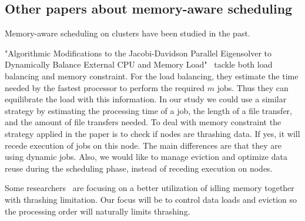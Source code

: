 \documentclass[a4paper]{article}
\begin{document}
\subsection{Other papers about memory-aware scheduling}
Memory-aware scheduling on clusters have been studied in the past.
 
"Algorithmic Modifications to the
Jacobi-Davidson Parallel Eigensolver to Dynamically Balance External CPU and Memory Load"~\cite{loadbalance_and_trashing} tackle both load balancing and memory constraint. For the load balancing, they 
estimate the time needed by the fastest processor to perform the required $m$ jobs. Thus they can equilibrate the load
with this information. In our study we could use a similar strategy by estimating the 
processing time of a job, the length of a file transfer, and the amount of file transfers needed.
To deal with memory constraint the strategy applied in the paper is to check if 
nodes are thrashing data. If yes, it will recede execution of jobs on this node.
The main differences are that they are using dynamic jobs. Also, we would like to 
manage eviction and optimize data reuse during the scheduling phase, instead of
receding execution on nodes.

Some researchers~\cite{Nikolopoulos2003AdaptiveSU}
are focusing on a better utilization of idling memory together with 
thrashing limitation. Our focus will be to control data loads and eviction so the
processing order will naturally limits thrashing.
\end{document}

